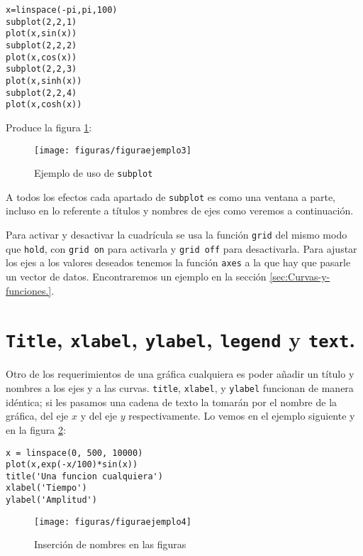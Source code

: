 \begin{verbatim}
x=linspace(-pi,pi,100)
subplot(2,2,1)
plot(x,sin(x))
subplot(2,2,2)
plot(x,cos(x))
subplot(2,2,3)
plot(x,sinh(x))
subplot(2,2,4)
plot(x,cosh(x))
\end{verbatim}
Produce la figura \ref{cap:Ejemplo-de-uso}:

%
\begin{figure}[h]
  \centering{}
  \texttt{[image: figuras/figuraejemplo3]}


\caption{\label{cap:Ejemplo-de-uso}Ejemplo de uso de \texttt{subplot}}
\end{figure}


A todos los efectos cada apartado de \texttt{subplot} es como una
ventana a parte, incluso en lo referente a títulos y nombres de ejes
como veremos a continuación.

Para activar y desactivar la cuadrícula se usa la función \texttt{grid}
del mismo modo que \texttt{hold}, con \texttt{grid on} para activarla
y \texttt{grid off} para desactivarla. Para ajustar los ejes a los
valores deseados tenemos la función \texttt{axes} a la que hay que
pasarle un vector de datos. Encontraremos un ejemplo en la sección
\ref{sec:Curvas-y-funciones.}.


\section{\texttt{Title}, \texttt{xlabel},
  \texttt{ylabel}, \texttt{legend} y
  \texttt{text}.}

Otro de los requerimientos de una gráfica cualquiera es poder añadir
un título y nombres a los ejes y a las curvas. \texttt{title},
\texttt{xlabel}, y \texttt{ylabel} funcionan de manera idéntica; si
les pasamos una cadena de texto la tomarán por el nombre de la
gráfica, del eje $x$ y del eje $y$ respectivamente. Lo vemos en el
ejemplo siguiente y en la figura \ref{cap:Inserci=F3n-de-nombres}:

\begin{verbatim}
x = linspace(0, 500, 10000)
plot(x,exp(-x/100)*sin(x))
title('Una funcion cualquiera')
xlabel('Tiempo')
ylabel('Amplitud')
\end{verbatim}

\begin{figure}[H]
  \centering{}

  \texttt{[image: figuras/figuraejemplo4]}


  \caption{\label{cap:Inserci=F3n-de-nombres}Inserción de nombres en
    las figuras}
\end{figure}


